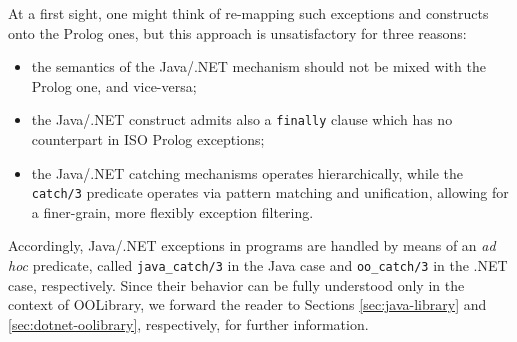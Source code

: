 At a first sight, one might think of re-mapping such exceptions and constructs onto the Prolog ones, but this approach is unsatisfactory for three reasons:
%
\begin{itemize}
  \item the semantics of the Java/.NET mechanism should not be mixed with the Prolog one, and vice-versa;

  \item the Java/.NET construct admits also a \texttt{finally} clause which has no counterpart in ISO Prolog exceptions;

  \item the Java/.NET catching mechanisms operates hierarchically, while the \texttt{catch/3} predicate operates via pattern matching and unification, allowing for a finer-grain, more flexibly exception filtering.
\end{itemize}

%
\noindent Accordingly, Java/.NET exceptions in \tuprolog{} programs are handled by means of an \textit{ad hoc} predicate, called \texttt{java\_catch/3} in the Java case and \texttt{oo\_catch/3} in the .NET case, respectively.
%
Since their behavior can be fully understood only in the context of OOLibrary, we forward the reader to Sections \ref{sec:java-library} and \ref{sec:dotnet-oolibrary}, respectively, for further information.

